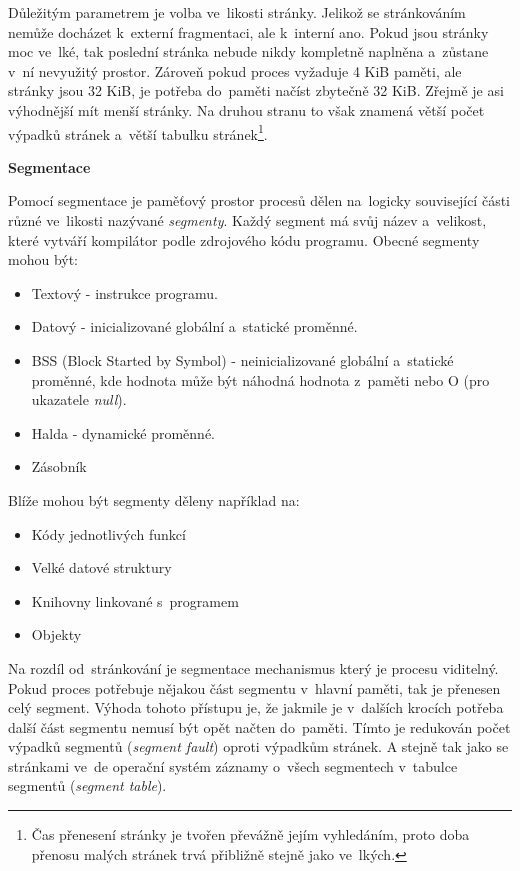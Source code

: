 Důležitým parametrem je volba ve~likosti stránky. Jelikož se stránkováním nemůže docházet k~externí fragmentaci, ale k~interní ano. Pokud jsou stránky moc ve~lké, tak poslední stránka nebude nikdy kompletně naplněna a~zůstane v~ní nevyužitý prostor. Zároveň pokud proces vyžaduje 4 KiB paměti, ale stránky jsou 32 KiB, je potřeba do~paměti načíst zbytečně 32 KiB. Zřejmě je asi výhodnější mít menší stránky. Na druhou stranu to však znamená větší počet výpadků stránek a~větší tabulku stránek\footnote{Čas přenesení stránky je tvořen převážně jejím vyhledáním, proto doba přenosu malých stránek trvá přibližně stejně jako ve~lkých.}. 

\clearpage

\begin{Large}
    \vspace{0,5cm}
    \textbf{Segmentace}
\end{Large}

Pomocí segmentace je paměťový prostor procesů dělen na~logicky související části různé ve~likosti nazývané \emph{segmenty}. Každý segment má svůj název a~velikost, které vytváří kompilátor podle zdrojového kódu programu. Obecné segmenty mohou být:

\begin{itemize}
    \item Textový - instrukce programu.
    \item Datový - inicializované globální a~statické proměnné.
    \item BSS (Block Started by Symbol) - neinicializované globální a~statické proměnné, kde hodnota může být náhodná hodnota z~paměti nebo O (pro ukazatele \emph{null}).
    \item Halda - dynamické proměnné.
    \item Zásobník
\end{itemize}

Blíže mohou být segmenty děleny například na:

\begin{itemize}
    \item Kódy jednotlivých funkcí
    \item Velké datové struktury
    \item Knihovny linkované s~programem 
    \item Objekty
\end{itemize}

Na rozdíl od~stránkování je segmentace mechanismus který je procesu viditelný. Pokud proces potřebuje nějakou část segmentu v~hlavní paměti, tak je přenesen celý segment. Výhoda tohoto přístupu je, že jakmile je v~dalších krocích potřeba další část segmentu nemusí být opět načten do~paměti. Tímto je redukován počet výpadků segmentů (\emph{segment fault}) oproti výpadkům stránek. A stejně tak jako se stránkami ve~de operační systém záznamy o~všech segmentech v~tabulce segmentů (\emph{segment table}). 

